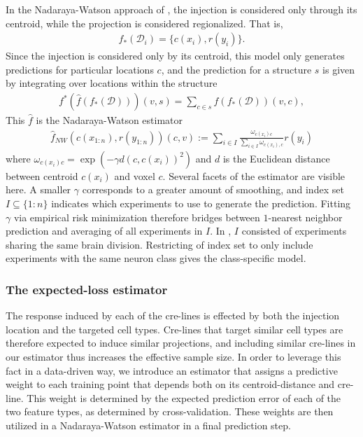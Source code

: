 In the Nadaraya-Watson approach of \citet{Knox2019-ot}, the injection is considered only through its centroid, while the projection is considered regionalized.
That is,
\begin{eqnarray*}
f_*({\mathcal D}_i) = \{c(x_i) , r(y_i)\}.
\end{eqnarray*}
Since the injection is considered only by its centroid, this model only generates predictions for particular locations $c$, and the prediction for a structure $s$ is given by integrating over locations within the structure
\begin{eqnarray*}
\label{eq:regionalize}
f^* (\hat f (f_*(\mathcal D))) (v,s) = \sum_{c \in s} \hat f (f_*(\mathcal D)) (v,c),
\end{eqnarray*}
This $\hat f$ is the Nadaraya-Watson estimator
\begin{eqnarray*}
\hat f_{NW}( c(x_{1:n}) , r(y_{1:n}) ) (c,v) :=  \sum_{i \in I} \frac{ \omega_{c(x_i) c}}{\sum_{i \in I} \omega_{c(x_i), c}} r(y_i)
\end{eqnarray*}
where $\omega_{c(x_i) c} = \exp( - \gamma d( c , c(x_i))^2 )$ and $d$ is the Euclidean distance between centroid $c(x_i)$ and voxel $c$.
Several facets of the estimator are visible here. %
A smaller $\gamma$ corresponds to a greater amount of smoothing, and index set $I \subseteq  \{1:n\}$ indicates which experiments to use to generate the prediction.
Fitting $\gamma$ via empirical risk minimization therefore bridges between $1$-nearest neighbor prediction and averaging of all experiments in $I$.
In \citet{Knox2019-ot}, $I$ consisted of experiments sharing the same brain division.
 Restricting of index set to only include experiments with the same neuron class gives the class-specific model.

\newpage
\subsubsection{The expected-loss estimator}

\label{supp_sec:el}

The response induced by each of the cre-lines is effected by both the injection location and the targeted cell types.
Cre-lines that target similar cell types are therefore expected to induce similar projections, and including similar cre-lines in our estimator thus increases the effective sample size.
In order to leverage this fact in a data-driven way, we introduce an estimator that assigns a predictive weight to each training point that depends both on its centroid-distance and cre-line.
This weight is determined by the expected prediction error of each of the two feature types, as determined by cross-validation.
These weights are then utilized in a Nadaraya-Watson estimator in a final prediction step.

